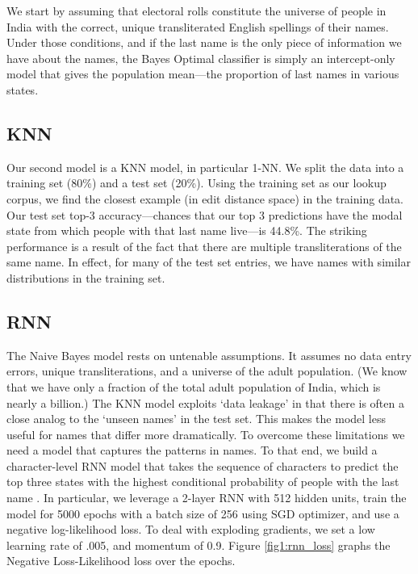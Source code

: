 \documentclass[11pt,  letterpaper]{article}
\begin{document}
We start by assuming that electoral rolls constitute the universe of people in India with the correct, unique transliterated English spellings of their names. Under those conditions, and if the last name is the only piece of information we have about the names, the Bayes Optimal classifier is simply an intercept-only model that gives the population mean---the proportion of last names in various states. 

\subsection{KNN}

Our second model is a KNN model, in particular 1-NN. We split the data into a training set (80\%) and a test set (20\%). Using the training set as our lookup corpus, we find the closest example (in edit distance space) in the training data. Our test set top-3 accuracy---chances that our top 3 predictions have the modal state from which people with that last name live---is 44.8\%. The striking performance is a result of the fact that there are multiple transliterations of the same name. In effect, for many of the test set entries, we have names with similar distributions in the training set. 

\subsection{RNN}

The Naive Bayes model rests on untenable assumptions. It assumes no data entry errors, unique transliterations, and a universe of the adult population. (We know that we have only a fraction of the total adult population of India, which is nearly a billion.) The KNN model exploits `data leakage' in that there is often a close analog to the `unseen names' in the test set. This makes the model less useful for names that differ more dramatically. To overcome these limitations we need a model that captures the patterns in names. To that end, we build a character-level RNN model that takes the sequence of characters to predict the top three states with the highest conditional probability of people with the last name \citep{10.1145/3426826.3426842, 8469258}. In particular, we leverage a 2-layer RNN with 512 hidden units, train the model for 5000 epochs with a batch size of 256 using SGD optimizer, and use a negative log-likelihood loss. To deal with exploding gradients, we set a low learning rate of .005, and momentum of 0.9. Figure \ref{fig1:rnn_loss} graphs the Negative Loss-Likelihood loss over the epochs.
\end{document}
